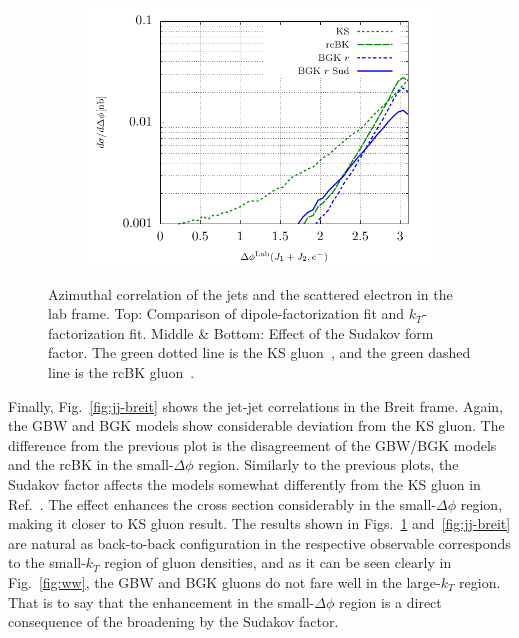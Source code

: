 \documentclass[11pt]{article}
\numberwithin{equation}{section}
\numberwithin{table}{section}
\numberwithin{figure}{section}
\begin{document}
\begin{figure}[p]
\begin{subfigure}{0.5\textwidth}
	\end{subfigure}
	\begin{subfigure}{0.5\textwidth}
		\includegraphics[width=\textwidth]{plots/plotBGK3Lab}
	\end{subfigure}
\caption{\footnotesize Azimuthal correlation of the jets and the scattered electron in the lab frame. Top: Comparison of dipole-factorization fit and $k_T$-factorization fit. Middle \& Bottom: Effect of the Sudakov form factor. The green dotted line is the KS gluon~\cite{vanHameren:2021sqc}, and the green dashed line is the rcBK gluon~\cite{}.}
\label{fig:je-lab}
\end{figure}

Finally, Fig.~\ref{fig:jj-breit} shows the jet-jet correlations in the Breit frame. Again, the GBW and BGK models show considerable deviation from the KS gluon. The difference from the previous plot is the disagreement of the GBW/BGK models and the rcBK in the small-$\Delta\phi$ region. Similarly to the previous plots, the Sudakov factor affects the models somewhat differently from the KS gluon in Ref.~\cite{vanHameren:2021sqc}.
The effect enhances the cross section considerably in the small-$\Delta\phi$ region, making it closer to KS gluon result.
The results shown in Figs.~\ref{fig:je-lab} and~\ref{fig:jj-breit} are natural as back-to-back configuration in the respective observable corresponds to the small-$k_T$ region of gluon densities, and as it can be seen clearly in Fig.~\ref{fig:ww}, the GBW and BGK gluons do not fare well in the large-$k_T$ region. 
That is to say that the enhancement in the small-$\Delta\phi$ region is a direct consequence of the broadening by the Sudakov factor. 
\end{document}

